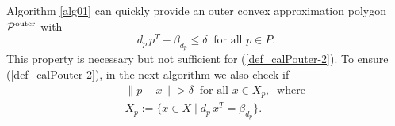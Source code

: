 \documentclass[12pt]{article}
\begin{document}
Algorithm \ref{alg01} can quickly provide an outer convex approximation polygon ${\cal P}^{\rm outer}$ with
\begin{equation}\label{smallerdelta}
d_{p}\, p^T - \beta_{d_{p}} \leq \delta \ \mbox{ for all } p \in P.
\end{equation}
This property is necessary but not sufficient for (\ref{def_calPouter-2}).
To ensure (\ref{def_calPouter-2}), in the next algorithm we also check if
\begin{equation}\label{checkdistance}
\begin{array}{lcl}
&& \|p - x\| > \delta \ \mbox{ for all } x \in X_p, \ \mbox{ where} \\
&& X_p := \{x \in X \mid d_{p}\, x^T = \beta_{d_{p}}\}.
\end{array}
\end{equation}
\end{document}

